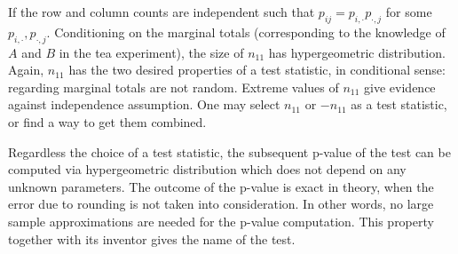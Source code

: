 If the row and column counts are independent such that
$p_{ij} = p_{i,\cdot} p_{\cdot, j}$ for some $p_{i,\cdot}, p_{\cdot, j}$.
Conditioning on the marginal totals (corresponding to
the knowledge of $A$ and $B$ in the tea experiment), 
the size of $n_{11}$ has hypergeometric distribution.
Again, $n_{11}$ has the two desired properties of a test statistic,
in conditional sense: regarding marginal totals are not random.
Extreme values of $n_{11}$ give evidence against independence
assumption. One may select $n_{11}$ or $-n_{11}$ as a test
statistic, or find a way to get them combined.

Regardless the choice of a test statistic,
the subsequent p-value of the test can be computed 
via hypergeometric distribution
which does not depend on any unknown parameters.
The outcome of the p-value is exact in theory, when
the error due to rounding is not taken into consideration. 
In other words, no large sample approximations are needed for the p-value computation.
This property together with its inventor gives the name of the test.


